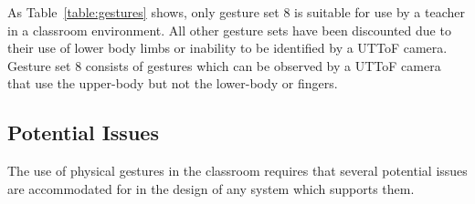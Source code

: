 \documentclass[manuscript, review, screen]{acmart}
\newcommand{\tickYes}{\checkmark}
\newcommand{\crossNo}{$\times$}
\begin{document}


As Table~\ref{table:gestures} shows, only gesture set 8 is suitable for use by a teacher in a classroom environment.
All other gesture sets have been discounted due to their use of lower body limbs or inability to be identified by a \ac{UTToF} camera.
Gesture set 8 consists of gestures which can be observed by a \ac{UTToF} camera that use the upper-body but not the lower-body or fingers.

\subsection{Potential Issues}  
\label{sec:attention}

The use of physical gestures in the classroom requires that several potential issues are accommodated for in the design of any system which supports them.
\end{document}
